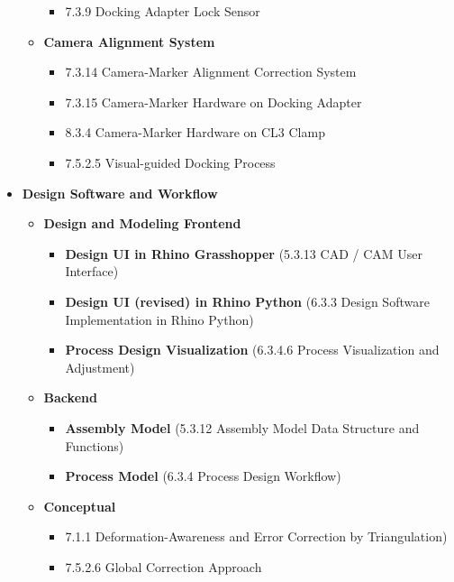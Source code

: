 \documentclass[11pt]{book}
\begin{document}
\begin{itemize}
\begin{itemize}
\begin{itemize}
	\item 7.3.9 Docking Adapter Lock Sensor

\end{itemize}
	\item \textbf{Camera Alignment System}

\begin{itemize}
	\item 7.3.14 Camera-Marker Alignment Correction System

	\item 7.3.15 Camera-Marker Hardware on Docking Adapter

	\item 8.3.4 Camera-Marker Hardware on CL3 Clamp

	\item 7.5.2.5 Visual-guided Docking Process

\end{itemize}
\end{itemize}
	\item \textbf{Design Software and Workflow}

\begin{itemize}
	\item \textbf{Design and Modeling Frontend}

\begin{itemize}
	\item \textbf{Design UI in Rhino Grasshopper} (5.3.13 CAD / CAM User Interface)

	\item \textbf{Design UI (revised) in Rhino Python }(6.3.3 Design Software Implementation in Rhino Python)

	\item \textbf{Process Design Visualization} (6.3.4.6 Process Visualization and Adjustment)

\end{itemize}
	\item \textbf{Backend}

\begin{itemize}
	\item \textbf{Assembly Model} (5.3.12 Assembly Model Data Structure and Functions)

	\item \textbf{Process Model} (6.3.4 Process Design Workflow)

\end{itemize}
	\item \textbf{Conceptual}

\begin{itemize}
	\item 7.1.1 Deformation-Awareness and Error Correction by Triangulation)

	\item 7.5.2.6 Global Correction Approach

\end{itemize}
\end{itemize}
\end{itemize}
\end{document}

